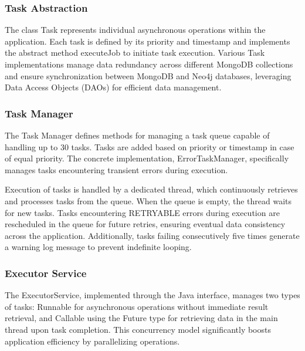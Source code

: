 \subsubsection*{Task Abstraction}

The class Task represents individual asynchronous operations within the application. Each task is defined by its priority and timestamp 
and implements the abstract method executeJob to initiate task execution. Various Task implementations manage data redundancy across different 
MongoDB collections and ensure synchronization between MongoDB and Neo4j databases, leveraging Data Access Objects (DAOs) for efficient data management.

\subsubsection*{Task Manager}

The Task Manager defines methods for managing a task queue capable of handling up to 30 tasks. Tasks are added based on priority 
or timestamp in case of equal priority. The concrete implementation, ErrorTaskManager, specifically manages tasks encountering transient errors during execution.

\vspace{\baselineskip}

Execution of tasks is handled by a dedicated thread, which continuously retrieves and processes tasks from the queue. When the queue is empty, the 
thread waits for new tasks. Tasks encountering RETRYABLE errors during execution are rescheduled in the queue for future retries, ensuring eventual
data consistency across the application. Additionally, tasks failing consecutively five times generate a warning log message to prevent indefinite looping.

\subsubsection*{Executor Service}

The ExecutorService, implemented through the Java interface, manages two types of tasks: Runnable for asynchronous operations 
without immediate result retrieval, and Callable using the Future type for retrieving data in the main thread upon task completion. 
This concurrency model significantly boosts application efficiency by parallelizing operations.

\vspace{\baselineskip}

